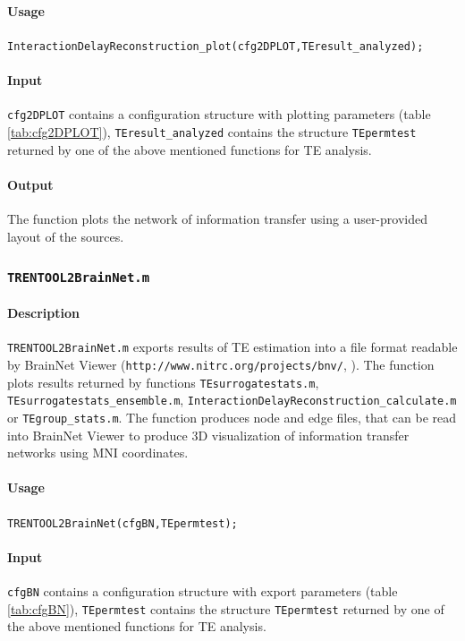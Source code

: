 \documentclass[a4paper,10pt]{article}
\begin{document}
\paragraph*{Usage} \texttt{InteractionDelayReconstruction\_plot(cfg2DPLOT,TEresult\_analyzed);} 

\paragraph*{Input} \texttt{cfg2DPLOT} contains a configuration structure with plotting parameters (table \ref{tab:cfg2DPLOT}), \texttt{TEresult\_analyzed} contains the structure \texttt{TEpermtest} returned by one of the above mentioned functions for TE analysis.

\paragraph*{Output} The function plots the network of information transfer using a user-provided layout of the sources. 

\subsubsection{\texttt{TRENTOOL2BrainNet.m}}

\paragraph*{Description} \texttt{TRENTOOL2BrainNet.m} exports results of TE estimation into a file format readable by BrainNet Viewer (\texttt{http://www.nitrc.org/projects/bnv/}, \cite{xia2013}). The function plots results returned by functions \texttt{TEsurrogatestats.m}, \texttt{TEsurrogatestats\_ensemble.m}, \texttt{InteractionDelayReconstruction\_calculate.m} or \texttt{TEgroup\_stats.m}. The function produces node and edge files, that can be read into BrainNet Viewer to produce 3D visualization of information transfer networks using MNI coordinates.

\paragraph*{Usage} \texttt{TRENTOOL2BrainNet(cfgBN,TEpermtest);} 

\paragraph*{Input} \texttt{cfgBN} contains a configuration structure with export parameters (table \ref{tab:cfgBN}), \texttt{TEpermtest} contains the structure \texttt{TEpermtest} returned by one of the above mentioned functions for TE analysis.
\end{document}

